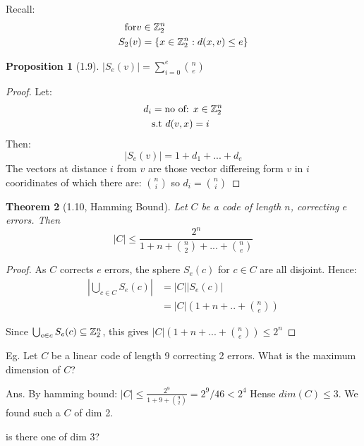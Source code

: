 \documentclass[]{article}
\newtheorem{thm}{Theorem}[section]
\newtheorem{prop}[thm]{Proposition}
\theoremstyle{definition}
\theoremstyle{remark}
\numberwithin{equation}{section}
\begin{document}
		Recall:
		\begin{align*}
			\text{for} v &\in \mathbb{Z}_2^n \\
				S_2(v) &= \{x \in \mathbb{Z}_2^n: d(x,v)\leq e\}
		\end{align*}

		\begin{prop}[1.9]
			$|S_e(v)| = \displaystyle\sum_{i=0}^{e} \binom{n}{e}  $ %
		\end{prop}

		\begin{proof}
			Let:
			\begin{align*}
				d_i &= \text{no of: } x\in \mathbb{Z}_2^n \\
					&\text{s.t } d(v,x) = i
			\end{align*}
			Then:
			\[ |S_e(v)| = 1 + d_1 + ... + d_e\]
			The vectors at distance $i$ from $v$ are those vector differeing form $v$ in $i$ cooridinates of which there are: $\binom{n}{i}$ so $d_i = \binom{n}{i}$
		\end{proof}

		\begin{thm}[1.10, Hamming Bound]
			Let $C$ be a code of length $n$, correcting $e$ errors. \newline
			Then \[ |C| \leq \frac{2^n}{1 + n + \binom{n}{2} + ... + \binom{n}{e}}\]
		\end{thm}

		\begin{proof}
			As $C$ corrects $e$ errors, the sphere $S_e(c)$ for $c \in C$ are all disjoint. Hence: \newline
			\begin{align*}
				| \bigcup_{c\in C} S_e(c)| &= |C| | S_e(c)| \\
											&= |C| (1 + n + .. + \binom{n}{e})
			\end{align*}

			Since $\bigcup_{c \in c} S_e(c) \subseteq \mathbb{Z}_2^n$, this gives \newline
			$|C| (1 + n + ... + \binom{n}{e}) \leq 2^n$
		\end{proof}

		Eg. Let $C$ be a linear code of length 9 correcting 2 errors. What is the maximum dimension of $C$?

		Ans. By hamming bound: \newline
			$|C| \leq \frac{2^9}{1+9+ \binom{9}{2}}= 2^9/46 < 2^4$
			Hense $dim(C) \leq 3$.
			We found such a $C$ of dim 2.

			is there one of dim 3?
\end{document}
